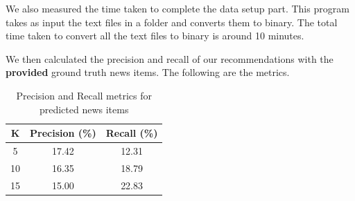 \documentclass[hidelinks,12pt]{article}
\begin{document}
We also measured the time taken to complete the data setup part. This program takes as input the
text files in a folder and converts them to binary. The total time taken to convert all the text files to binary is
around 10 minutes.

We then calculated the precision and recall of our recommendations with the \textbf{provided} ground truth news items. The following are the metrics.

\begin{table}[H]
  \centering
  \begin{tabular}{|c|c|c|}
    \hline
    K  & Precision (\%) & Recall (\%) \\ \hline
    5  & 17.42          & 12.31       \\
    10 & 16.35          & 18.79       \\
    15 & 15.00          & 22.83       \\
    \hline
  \end{tabular}
  \caption{Precision and Recall metrics for predicted news items}
\end{table}
\end{document}
